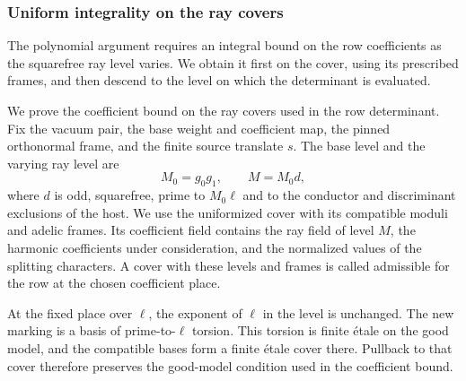 \subsubsection*{Uniform integrality on the ray covers}
\label{subsec:theta-cover-integrality}
\hypertarget{source-theta-cover-integrality}{}

The polynomial argument requires an integral bound on the row coefficients as the squarefree ray level varies. We obtain it first on the cover, using its prescribed frames, and then descend to the level on which the determinant is evaluated.

\begin{paramdefinition}\label{hyp:ray-cover-integrality}
We prove the coefficient bound on the ray covers used in the
row determinant. Fix the vacuum pair, the base weight and
coefficient map, the pinned orthonormal frame, and the finite
source translate \(s\). The base level and the varying ray level are
\[
 M_0=g_0g_1,\qquad M=M_0d,
\]
where \(d\) is odd,
squarefree, prime to \(M_0\ell\) and to the conductor and
discriminant exclusions of the host. We use the uniformized
cover with its compatible moduli and adelic frames. Its
coefficient field contains the ray field of level \(M\), the
harmonic coefficients under consideration, and the normalized
values of the splitting characters. A cover with these levels and frames is called admissible for the row at the chosen coefficient place.
\end{paramdefinition}

At the fixed place over \(\ell\), the exponent of \(\ell\) in the level is unchanged. The new marking is a basis of prime-to-\(\ell\) torsion. This torsion is finite étale on the good model, and the compatible bases form a finite étale cover there. Pullback to that cover therefore preserves the good-model condition used in the coefficient bound.

